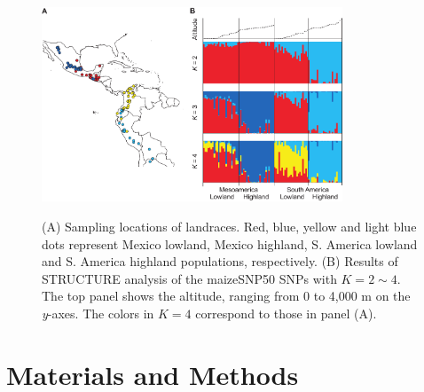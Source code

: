 
\begin{figure}[tb]   
  \begin{center}
   \vspace{-0mm}
   \includegraphics[width=0.8\textwidth]{fig/Fig2}
   \renewcommand{\baselinestretch}{0.9}
   \vspace{-3mm}
   \caption{(A) Sampling locations of landraces.  Red, blue, yellow and light blue dots represent Mexico lowland, Mexico highland, S. America lowland and S. America highland populations, respectively.  (B) Results of {\sf STRUCTURE} analysis of the maizeSNP50 SNPs with $K=2\sim4$.  The top panel shows the altitude, ranging from 0 to 4,000 m on the \emph{y}-axes.  The colors in $K=4$ correspond to those in panel (A).    }
\vspace{-6mm}
    \label{map}
  \end{center}
\end{figure}

\section*{Materials and Methods}

